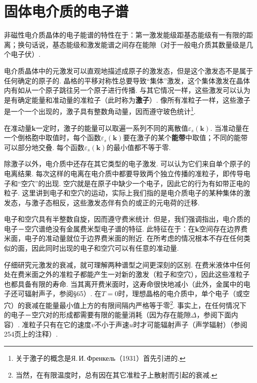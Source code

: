 \section{固体电介质的电子谱}

非磁性电介质晶体的电子能谱的特性在于：第一激发能级距基态能级有一有限的距离；换句话说，基态能级和激发能谱之间存在能隙（对于一般电介质其数量级是几个电子伏）.

电介质晶体中的元激发可以直观地描述成原子的激发态，但是这个激发态不是属于任何确定的原子的. 晶格的平移对称性总要导致“集体”激发，这个集体激发在晶体内有如从一个原子跳往另一个原子进行传播. 与其它情况一样，这些激发可以认为是有确定能量和准动量的准粒子（此时称为\textbf{激子}）. 像所有准粒子一样，这些激子是一个一个出现的，激子具有整数角动量，因而遵守玻色统计\footnote{关于激子的概念是Я.\,И.\,Френкель（1931）首先引进的.}.

在准动量$\bm{k}$一定时，激子的能量可以取遍一系列不同的离散值$\varepsilon_s(\bm{k})$. 当准动量在一个倒格胞中取值时，每个函数$\varepsilon_s(\bm{k})$要在激子的某个\textbf{能带}中取值；不同的能带可以部分地交叠. 每个函数$\varepsilon_s(\bm{k})$的最小值都不等于零.

除激子以外，电介质中还存在其它类型的电子激发. 可以认为它们来自单个原子的电离结果. 每次这样的电离在电介质中都要导致两个独立传播的准粒子，即传导电子和“空穴”的出现. 空穴就是在原子中缺少一个电子，因此它的行为有如带正电的粒子. 这里讲到电子和空穴的运动，实际上我们指的是电介质电子的某种集体的激发态，与激子态相反，这些激发态伴有负的或正的元电荷的迁移.

电子和空穴具有半整数自旋，因而遵守费米统计. 但是，我们强调指出，电介质的电子－空穴谱绝没有金属费米型电子谱的特征. 此特征在于：在$\bm{k}$空间存在边界费米面，电子的准动量就位于边界费米面的附近. 在所考虑的情况根本不存在任何类似的面，因此同时出现的电子和空穴可以有任意的准动量.

仔细研究元激发的衰减，就可理解两种谱型之间更深刻的区别. 在费米液体中任何处在费米面之外的准粒子都能产生一对新的激发（粒子和空穴），因此这些准粒子也都具备有限的寿命. 当其离开费米面时，这寿命很快地减小（此外，金属中的电子还可辐射声子，参阅§65）. 在$T=0$时，理想晶格的电介质中，单个电子（或空穴）的衰减在能量最小值上方的有限间隔内严格等于零\footnote{当然，在有限温度时，总有因在其它准粒子上散射而引起的衰减.}. 事实上，在任何情况下的电子－空穴对的形成都需要有限的能量消耗（因为存在能隙$\Delta$，参阅下面内容）. 准粒子只有在它的速度$v$不小于声速$u$时才可能辐射声子（声学辐射）（参阅254页上的注释）.


